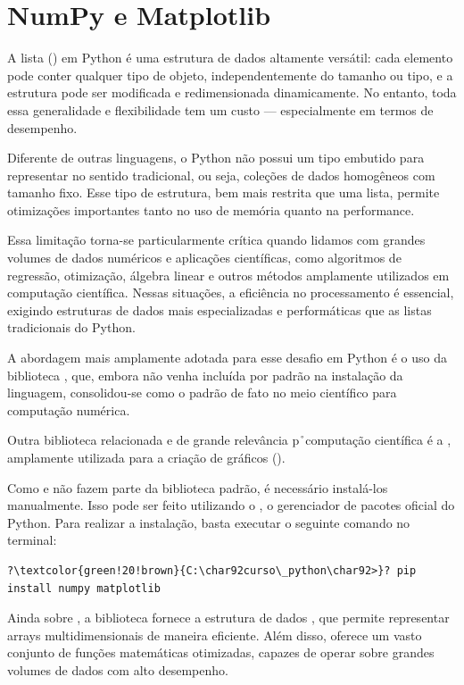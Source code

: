\chapter{NumPy e Matplotlib}\label{numpy}

A lista () em Python é uma estrutura de dados altamente versátil: cada elemento pode conter qualquer tipo
de objeto, independentemente do tamanho ou tipo, e a estrutura pode ser modificada e redimensionada dinamicamente.
No entanto, toda essa generalidade e flexibilidade tem um custo --- especialmente em termos de desempenho.

Diferente de outras linguagens, o Python não possui um tipo embutido para representar  no sentido
tradicional, ou seja, coleções de dados homogêneos com tamanho fixo.
Esse tipo de estrutura, bem mais restrita que uma lista, permite otimizações importantes tanto no uso de memória quanto
na performance.

Essa limitação torna-se particularmente crítica quando lidamos com grandes volumes de dados numéricos e aplicações
científicas, como algoritmos de regressão, otimização, álgebra linear e outros métodos amplamente utilizados em
computação científica.
Nessas situações, a eficiência no processamento é essencial, exigindo estruturas de dados mais especializadas e
performáticas que as listas tradicionais do Python.

A abordagem mais amplamente adotada para esse desafio em Python é o uso da biblioteca , que, embora não
venha incluída por padrão na instalação da linguagem, consolidou-se como o padrão de fato no meio científico para
computação numérica.

Outra biblioteca relacionada e de grande relevância p\r\ computação científica é a , amplamente 
utilizada para a criação de gráficos ().


Como  e  não fazem parte da biblioteca padrão, é necessário instalá-los manualmente.
Isso pode ser feito utilizando o , o gerenciador de pacotes oficial do Python.
Para realizar a instalação, basta executar o seguinte comando no terminal:
\begin{verbatim}
?\textcolor{green!20!brown}{C:\char92curso\_python\char92>}? pip install numpy matplotlib
\end{verbatim}

Ainda sobre , a biblioteca fornece a estrutura de dados , que permite representar
arrays multidimensionais de maneira eficiente.
Além disso, oferece um vasto conjunto de funções matemáticas otimizadas, capazes de operar sobre grandes volumes
de dados com alto desempenho.


